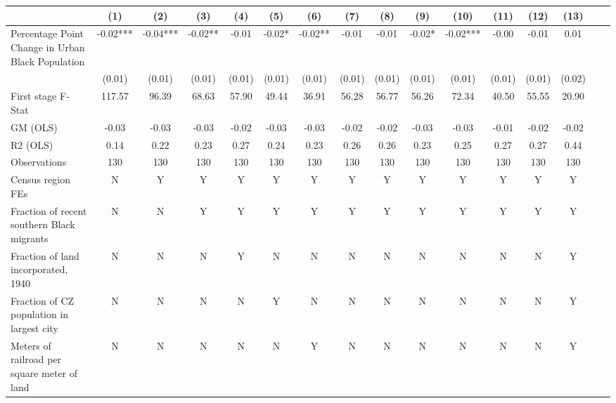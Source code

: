  \begin{tabular}{l*{15}{c}} \toprule
                    &\multicolumn{1}{c}{(1)}   &\multicolumn{1}{c}{(2)}   &\multicolumn{1}{c}{(3)}   &\multicolumn{1}{c}{(4)}   &\multicolumn{1}{c}{(5)}   &\multicolumn{1}{c}{(6)}   &\multicolumn{1}{c}{(7)}   &\multicolumn{1}{c}{(8)}   &\multicolumn{1}{c}{(9)}   &\multicolumn{1}{c}{(10)}   &\multicolumn{1}{c}{(11)}   &\multicolumn{1}{c}{(12)}   &\multicolumn{1}{c}{(13)}   \\
\midrule
Percentage Point Change in Urban Black Population& -0.02***& -0.04***& -0.02** & -0.01   & -0.02*  & -0.02** & -0.01   & -0.01   & -0.02*  & -0.02***& -0.00   & -0.01   &  0.01   \\
                    &(0.01)   &(0.01)   &(0.01)   &(0.01)   &(0.01)   &(0.01)   &(0.01)   &(0.01)   &(0.01)   &(0.01)   &(0.01)   &(0.01)   &(0.02)   \\
\midrule
First stage F-Stat  &117.57   & 96.39   & 68.63   & 57.90   & 49.44   & 36.91   & 56.28   & 56.77   & 56.26   & 72.34   & 40.50   & 55.55   & 20.90   \\
GM (OLS)            & -0.03   & -0.03   & -0.03   & -0.02   & -0.03   & -0.03   & -0.02   & -0.02   & -0.03   & -0.03   & -0.01   & -0.02   & -0.02   \\
R2 (OLS)            &  0.14   &  0.22   &  0.23   &  0.27   &  0.24   &  0.23   &  0.26   &  0.26   &  0.23   &  0.25   &  0.27   &  0.27   &  0.44   \\
Observations        &   130   &   130   &   130   &   130   &   130   &   130   &   130   &   130   &   130   &   130   &   130   &   130   &   130   \\
Census region FEs   &     N   &     Y   &     Y   &     Y   &     Y   &     Y   &     Y   &     Y   &     Y   &     Y   &     Y   &     Y   &     Y   \\
Fraction of recent southern Black migrants&     N   &     N   &     Y   &     Y   &     Y   &     Y   &     Y   &     Y   &     Y   &     Y   &     Y   &     Y   &     Y   \\
Fraction of land incorporated, 1940&     N   &     N   &     N   &     Y   &     N   &     N   &     N   &     N   &     N   &     N   &     N   &     N   &     Y   \\
Fraction of CZ population in largest city&     N   &     N   &     N   &     N   &     Y   &     N   &     N   &     N   &     N   &     N   &     N   &     N   &     Y   \\
Meters of railroad per square meter of land&     N   &     N   &     N   &     N   &     N   &     Y   &     N   &     N   &     N   &     N   &     N   &     N   &     Y   \\

\end{tabular}
